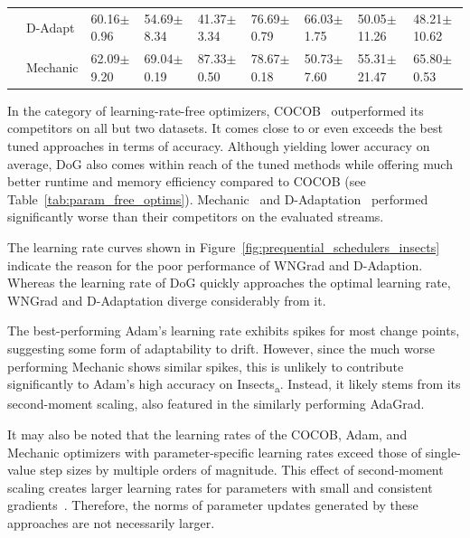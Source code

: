 \documentclass{article} %
\begin{document}
\begin{table}[ht]
\begin{tabular}{lllllllll}
                                                         & D-Adapt   & 60.16$\pm$0.96             & 54.69$\pm$8.34             & 41.37$\pm$3.34             & 76.69$\pm$0.79             & 66.03$\pm$1.75           & 50.05$\pm$11.26          & 48.21$\pm$10.62          \\
                                                         & Mechanic  & 62.09$\pm$9.20             & 69.04$\pm$0.19             & 87.33$\pm$0.50             & 78.67$\pm$0.18             & 50.73$\pm$7.60           & 55.31$\pm$21.47          & 65.80$\pm$0.53           \\
      \bottomrule
   \end{tabular}
   \label{tab:results_adaptive_optims}
\end{table}
In the category of learning-rate-free optimizers, COCOB~\citep{orabonaTrainingDeepNetworks2017} outperformed its competitors on all but two datasets.
It comes close to or even exceeds the best tuned approaches in terms of accuracy.
Although yielding lower accuracy on average, DoG also comes within reach of the tuned methods while offering much better runtime and memory efficiency compared to COCOB (see Table~\ref{tab:param_free_optims}).
Mechanic~\citep{cutkoskyMechanicLearningRate2023} and D-Adaptation~\citep{defazioLearningRateFreeLearningDAdaptation2023a} performed significantly worse than their competitors on the evaluated streams.

The learning rate curves shown in Figure~\ref{fig:prequential_schedulers_insects} indicate the reason for the poor performance of WNGrad and D-Adaption.
Whereas the learning rate of DoG quickly approaches the optimal learning rate, WNGrad and D-Adaptation diverge considerably from it.

The best-performing Adam's learning rate exhibits spikes for most change points, suggesting some form of adaptability to drift.
However, since the much worse performing Mechanic shows similar spikes, this is unlikely to contribute significantly to Adam's high accuracy on Insects\textsubscript{a}.
Instead, it likely stems from its second-moment scaling, also featured in the similarly performing AdaGrad.

It may also be noted that the learning rates of the COCOB, Adam, and Mechanic optimizers with parameter-specific learning rates exceed those of single-value step sizes by multiple orders of magnitude.
This effect of second-moment scaling creates larger learning rates for parameters with small and consistent gradients~\citep{cutkoskyMechanicLearningRate2023}.
Therefore, the norms of parameter updates generated by these approaches are not necessarily larger.
\end{document}
